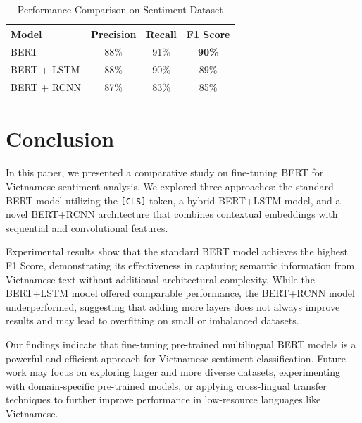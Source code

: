 \documentclass[11pt]{article}
\begin{document}
\begin{table}[h]
\centering
\caption{Performance Comparison on Sentiment Dataset}
\begin{tabular}{lccc}
\toprule
Model & Precision & Recall & F1 Score \\
\midrule
BERT & 88\% & 91\% & \textbf{90\%} \\
BERT + LSTM & 88\% & 90\% & 89\% \\
BERT + RCNN & 87\% & 83\% & 85\% \\
\bottomrule
\end{tabular}
\label{tab:results}
\end{table}


\section{Conclusion}
\label{sec:conclusion}
In this paper, we presented a comparative study on fine-tuning BERT for Vietnamese sentiment analysis. We explored three approaches: the standard BERT model utilizing the \texttt{[CLS]} token, a hybrid BERT+LSTM model, and a novel BERT+RCNN architecture that combines contextual embeddings with sequential and convolutional features.

Experimental results show that the standard BERT model achieves the highest F1 Score, demonstrating its effectiveness in capturing semantic information from Vietnamese text without additional architectural complexity. While the BERT+LSTM model offered comparable performance, the BERT+RCNN model underperformed, suggesting that adding more layers does not always improve results and may lead to overfitting on small or imbalanced datasets.

Our findings indicate that fine-tuning pre-trained multilingual BERT models is a powerful and efficient approach for Vietnamese sentiment classification. Future work may focus on exploring larger and more diverse datasets, experimenting with domain-specific pre-trained models, or applying cross-lingual transfer techniques to further improve performance in low-resource languages like Vietnamese.




\end{document}
